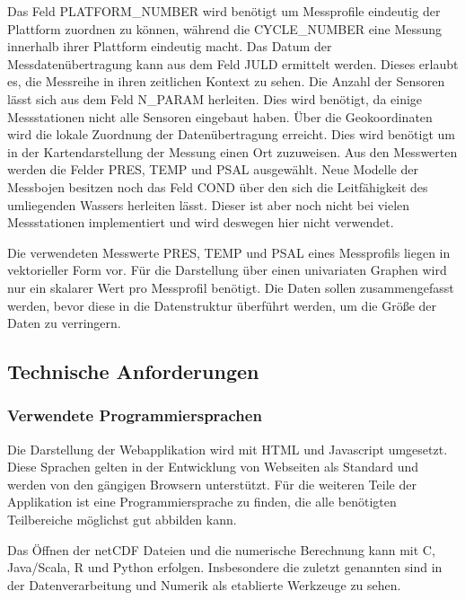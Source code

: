 Das Feld PLATFORM\_NUMBER wird benötigt um Messprofile eindeutig der Plattform zuordnen zu können, während die CYCLE\_NUMBER eine Messung innerhalb ihrer Plattform eindeutig macht. Das Datum der Messdatenübertragung kann aus dem Feld JULD ermittelt werden. Dieses erlaubt es, die Messreihe in ihren zeitlichen Kontext zu sehen. Die Anzahl der Sensoren lässt sich aus dem Feld N\_PARAM herleiten. Dies wird benötigt, da einige Messstationen nicht alle Sensoren eingebaut haben. Über die Geokoordinaten wird die lokale Zuordnung der Datenübertragung erreicht. Dies wird benötigt um in der Kartendarstellung der Messung einen Ort zuzuweisen.
Aus den Messwerten werden die Felder PRES, TEMP und PSAL ausgewählt. Neue Modelle der Messbojen besitzen noch das Feld COND über den sich die Leitfähigkeit des umliegenden Wassers herleiten lässt. Dieser ist aber noch nicht bei vielen Messstationen implementiert und wird deswegen hier nicht verwendet.

Die verwendeten Messwerte PRES, TEMP und PSAL eines Messprofils liegen in vektorieller Form vor. Für die Darstellung über einen univariaten Graphen wird nur ein skalarer Wert pro Messprofil benötigt. Die Daten sollen zusammengefasst werden, bevor diese in die Datenstruktur überführt werden, um die Größe der Daten zu verringern.


\subsection{Technische Anforderungen  }

\subsubsection{Verwendete Programmiersprachen}

Die Darstellung der Webapplikation wird mit HTML und Javascript umgesetzt. Diese Sprachen gelten in der Entwicklung von Webseiten als Standard und werden von den gängigen Browsern unterstützt.
Für die weiteren Teile der Applikation ist eine Programmiersprache zu finden, die alle benötigten Teilbereiche möglichst gut abbilden kann.

Das Öffnen der netCDF Dateien und die numerische Berechnung kann mit C, Java/Scala, R und Python erfolgen. Insbesondere die zuletzt genannten sind in der Datenverarbeitung und Numerik als etablierte Werkzeuge zu sehen.

